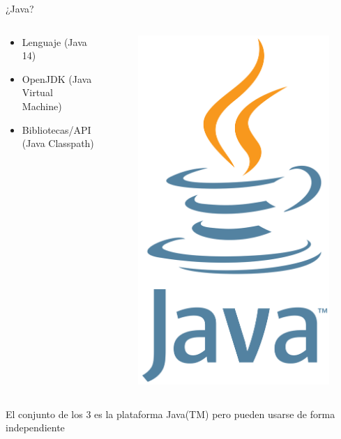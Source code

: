 \documentclass[aspectratio=169]{beamer}
\begin{document}
\begin{frame}[fragile]{¿Java?}
\begin{columns}
    \begin{column}{0.5\textwidth}
        \begin{itemize}
            \item Lenguaje (Java 14)
            \item OpenJDK (Java Virtual Machine)
            \item Bibliotecas/API (Java Classpath)
        \end{itemize}
    \end{column}
    \begin{column}{0.5\textwidth}  %
        \begin{figure}
            \centering
            \includegraphics[width=0.4\linewidth]{Images/java}
        \end{figure}
    \end{column}
\end{columns}



El conjunto de los 3 es la plataforma Java(TM) pero pueden usarse de forma independiente
\end{frame}
\end{document}
